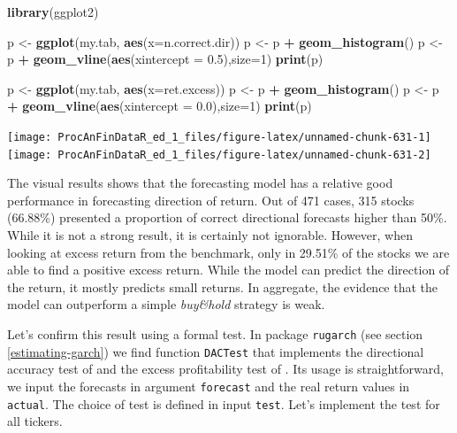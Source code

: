 \documentclass[11pt,]{book}
\newenvironment{Shaded}{\begin{snugshade}}{\end{snugshade}}
\newcommand{\KeywordTok}[1]{\textcolor[rgb]{0.27,0.27,0.27}{\textbf{#1}}}
\newcommand{\DataTypeTok}[1]{\textcolor[rgb]{0.27,0.27,0.27}{#1}}
\newcommand{\DecValTok}[1]{\textcolor[rgb]{0.06,0.06,0.06}{#1}}
\newcommand{\FloatTok}[1]{\textcolor[rgb]{0.06,0.06,0.06}{#1}}
\newcommand{\StringTok}[1]{\textcolor[rgb]{0.5,0.5,0.5}{#1}}
\newcommand{\OperatorTok}[1]{\textcolor[rgb]{0.81,0.36,0.00}{\textbf{#1}}}
\newcommand{\NormalTok}[1]{#1}
\begin{document}
\begin{Shaded}
\begin{Highlighting}[]
\KeywordTok{library}\NormalTok{(ggplot2)}

\NormalTok{p <-}\StringTok{ }\KeywordTok{ggplot}\NormalTok{(my.tab, }\KeywordTok{aes}\NormalTok{(}\DataTypeTok{x=}\NormalTok{n.correct.dir))}
\NormalTok{p <-}\StringTok{ }\NormalTok{p }\OperatorTok{+}\StringTok{ }\KeywordTok{geom_histogram}\NormalTok{()}
\NormalTok{p <-}\StringTok{ }\NormalTok{p }\OperatorTok{+}\StringTok{ }\KeywordTok{geom_vline}\NormalTok{(}\KeywordTok{aes}\NormalTok{(}\DataTypeTok{xintercept =}  \FloatTok{0.5}\NormalTok{),}\DataTypeTok{size=}\DecValTok{1}\NormalTok{)}
\KeywordTok{print}\NormalTok{(p)}

\NormalTok{p <-}\StringTok{ }\KeywordTok{ggplot}\NormalTok{(my.tab, }\KeywordTok{aes}\NormalTok{(}\DataTypeTok{x=}\NormalTok{ret.excess))}
\NormalTok{p <-}\StringTok{ }\NormalTok{p }\OperatorTok{+}\StringTok{ }\KeywordTok{geom_histogram}\NormalTok{()}
\NormalTok{p <-}\StringTok{ }\NormalTok{p }\OperatorTok{+}\StringTok{ }\KeywordTok{geom_vline}\NormalTok{(}\KeywordTok{aes}\NormalTok{(}\DataTypeTok{xintercept =}  \FloatTok{0.0}\NormalTok{),}\DataTypeTok{size=}\DecValTok{1}\NormalTok{)}
\KeywordTok{print}\NormalTok{(p)}
\end{Highlighting}
\end{Shaded}

\begin{center}\texttt{[image: ProcAnFinDataR\_ed\_1\_files/figure-latex/unnamed-chunk-631-1]} \texttt{[image: ProcAnFinDataR\_ed\_1\_files/figure-latex/unnamed-chunk-631-2]} \end{center}

The visual results shows that the forecasting model has a relative good
performance in forecasting direction of return. Out of 471 cases, 315
stocks (66.88\%) presented a proportion of correct directional forecasts
higher than 50\%. While it is not a strong result, it is certainly not
ignorable. However, when looking at excess return from the benchmark,
only in 29.51\% of the stocks we are able to find a positive excess
return. While the model can predict the direction of the return, it
mostly predicts small returns. In aggregate, the evidence that the model
can outperform a simple \emph{buy\&hold} strategy is weak.

Let's confirm this result using a formal test. In package
\texttt{rugarch} (see section \ref{estimating-garch}) we find function
\texttt{DACTest} that implements the directional accuracy test of
\citet{pesaran1992simple} and the excess profitability test of
\citet{anatolyev2005trading}. Its usage is straightforward, we input the
forecasts in argument \texttt{forecast} and the real return values in
\texttt{actual}. The choice of test is defined in input \texttt{test}.
Let's implement the test for all tickers. 
\end{document}

